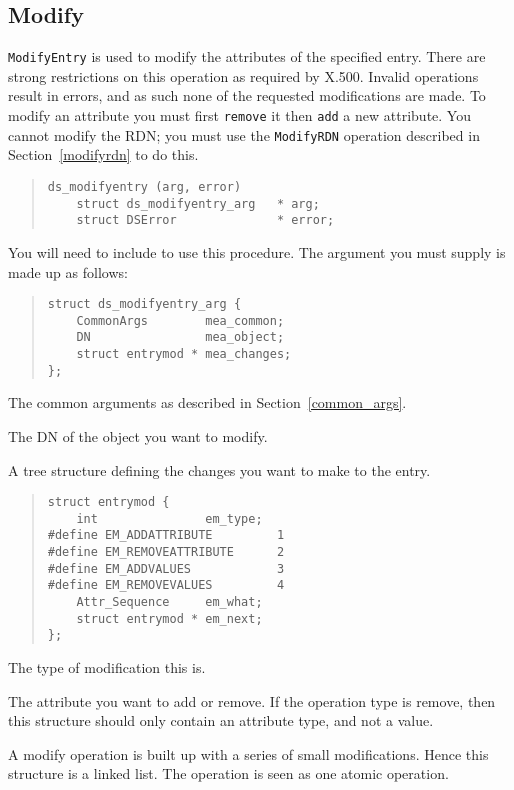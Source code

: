 \subsection {Modify}

\verb"ModifyEntry" is used to modify the attributes of the specified entry.
There are strong restrictions on this operation as required by X.500.
Invalid operations result in errors, and as such none of the requested
modifications are made.
To modify an attribute you must first \verb"remove" it then \verb"add" a new
attribute.
You cannot modify the RDN; you must use the \verb"ModifyRDN" operation
described in Section~\ref{modifyrdn} to do this.

\begin{quote}\small\begin{verbatim}
ds_modifyentry (arg, error)
    struct ds_modifyentry_arg   * arg;    
    struct DSError              * error;
\end{verbatim}\end{quote}

You will need to include  to use this procedure.
The argument you must supply is made up as follows:

\begin{quote}\small\begin{verbatim}
struct ds_modifyentry_arg {
    CommonArgs        mea_common;
    DN                mea_object;
    struct entrymod * mea_changes;
};
\end{verbatim}\end{quote}

\begin{describe}
\item [\verb"mea\_common":] The common arguments as described in
Section~\ref{common_args}.
\item [\verb"mea\_object":] The DN of the object you want to modify.
\item [\verb"mea\_changes":] A tree structure defining the changes you want to
make to the entry.
\begin{quote}\small\begin{verbatim}
struct entrymod {
    int               em_type;
#define EM_ADDATTRIBUTE         1
#define EM_REMOVEATTRIBUTE      2
#define EM_ADDVALUES            3
#define EM_REMOVEVALUES         4
    Attr_Sequence     em_what;
    struct entrymod * em_next;
};
\end{verbatim}\end{quote}
\begin{describe}
\item [\verb"em\_type":] The type of modification this is.
\item [\verb"em\_what":] The attribute you want to add or remove.  If the
operation type is remove, then this structure should only contain an
attribute type, and not a value.
\item [\verb"em\_next":] A modify operation is built up with a series of
small modifications.  Hence this structure is a linked list.
The operation is seen as one atomic operation.
\end{describe}
\end{describe}


